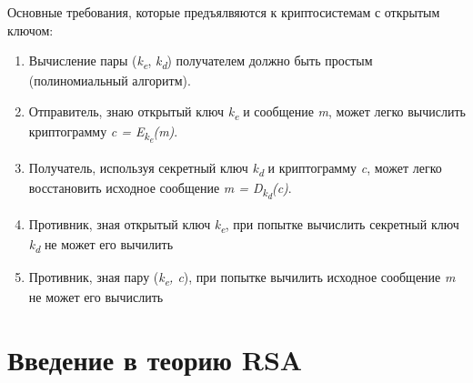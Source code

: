 Основные требования, которые предъялвяются к криптосистемам с открытым ключом:
\begin{enumerate}
	\item Вычисление пары (\textit{k\textsubscript{e}}, \textit{k\textsubscript{d}}) получателем должно быть простым (полиномиальный алгоритм).
	\item Отправитель, знаю открытый ключ \textit{k\textsubscript{e}} и сообщение \textit{m}, может легко вычислить криптограмму 
\textit{c = E\textsubscript{k\textsubscript{e}}(m)}.
	\item Получатель, используя секретный ключ \textit{k\textsubscript{d}} и криптограмму \textit{c}, может легко восстановить исходное сообщение 
\textit{m = D\textsubscript{k\textsubscript{d}}(c)}.
	\item Противник, зная открытый ключ \textit{k\textsubscript{e}}, при попытке вычислить секретный ключ \textit{k\textsubscript{d}} не может его 
вычилить
	\item Противник, зная пару (\textit{k\textsubscript{e}, c}), при попытке вычилить исходное сообщение \textit{m} не может его вычислить
\end{enumerate}

\section{Введение в теорию RSA}

